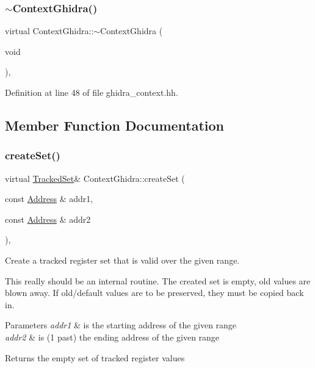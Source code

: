\mbox{\label{class_context_ghidra_abfd9482fa03d4b26dc0446ac531e1e43}} 
\subsubsection{\texorpdfstring{$\sim$ContextGhidra()}{~ContextGhidra()}}
{\footnotesize\ttfamily virtual Context\+Ghidra\+::$\sim$\+Context\+Ghidra (\begin{DoxyParamCaption}\item[{void}]{ }\end{DoxyParamCaption})\hspace{0.3cm}{\ttfamily [inline]}, {\ttfamily [virtual]}}



Definition at line 48 of file ghidra\+\_\+context.\+hh.



\subsection{Member Function Documentation}
\mbox{\label{class_context_ghidra_ab7f9df57870baceb7776fd8dcdbd5287}} 
\subsubsection{\texorpdfstring{createSet()}{createSet()}}
{\footnotesize\ttfamily virtual \mbox{\hyperlink{globalcontext_8hh_a7559d2c55c5d12fbbaf0418733b62438}{Tracked\+Set}}\& Context\+Ghidra\+::create\+Set (\begin{DoxyParamCaption}\item[{const \mbox{\hyperlink{class_address}{Address}} \&}]{addr1,  }\item[{const \mbox{\hyperlink{class_address}{Address}} \&}]{addr2 }\end{DoxyParamCaption})\hspace{0.3cm}{\ttfamily [inline]}, {\ttfamily [virtual]}}



Create a tracked register set that is valid over the given range. 

This really should be an internal routine. The created set is empty, old values are blown away. If old/default values are to be preserved, they must be copied back in. 
\begin{DoxyParams}{Parameters}
{\em addr1} & is the starting address of the given range \\
\hline
{\em addr2} & is (1 past) the ending address of the given range \\
\hline
\end{DoxyParams}
\begin{DoxyReturn}{Returns}
the empty set of tracked register values 
\end{DoxyReturn}


